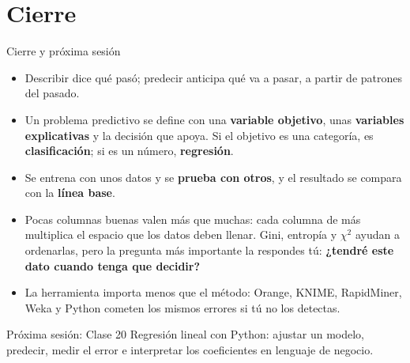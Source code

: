 \documentclass[aspectratio=169,11pt]{beamer}
\begin{document}
\section{Cierre}
\begin{frame}[t]{Cierre y próxima sesión}
  \begin{itemize}
    \footnotesize
    \item Describir dice qué pasó; predecir anticipa qué va a pasar, a
      partir de patrones del pasado.
    \item Un problema predictivo se define con una \textbf{variable
      objetivo}, unas \textbf{variables explicativas} y la decisión que
      apoya. Si el objetivo es una categoría, es \textbf{clasificación}; si
      es un número, \textbf{regresión}.
    \item Se entrena con unos datos y se \textbf{prueba con otros}, y el
      resultado se compara con la \textbf{línea base}.
    \item Pocas columnas buenas valen más que muchas: cada columna de más
      multiplica el espacio que los datos deben llenar. Gini, entropía y
      $\chi^2$ ayudan a ordenarlas, pero la pregunta más importante la
      respondes tú: \textbf{¿tendré este dato cuando tenga que decidir?}
    \item La herramienta importa menos que el método: Orange, KNIME,
      RapidMiner, Weka y Python cometen los mismos errores si tú no los
      detectas.
  \end{itemize}
  \vspace{0.05cm}
  \begin{block}{Próxima sesión: Clase 20}
    \footnotesize Regresión lineal con Python: ajustar un modelo, predecir, medir
    el error e interpretar los coeficientes en lenguaje de negocio.
  \end{block}
\end{frame}
\end{document}
